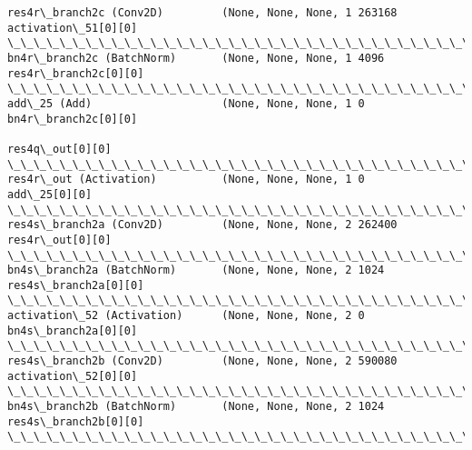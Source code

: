 \documentclass[11pt]{article}
\begin{document}
\begin{Verbatim}[commandchars=\\\{\}]
res4r\_branch2c (Conv2D)         (None, None, None, 1 263168      activation\_51[0][0]              
\_\_\_\_\_\_\_\_\_\_\_\_\_\_\_\_\_\_\_\_\_\_\_\_\_\_\_\_\_\_\_\_\_\_\_\_\_\_\_\_\_\_\_\_\_\_\_\_\_\_\_\_\_\_\_\_\_\_\_\_\_\_\_\_\_\_\_\_\_\_\_\_\_\_\_\_\_\_\_\_\_\_\_\_\_\_\_\_\_\_\_\_\_\_\_\_\_\_
bn4r\_branch2c (BatchNorm)       (None, None, None, 1 4096        res4r\_branch2c[0][0]             
\_\_\_\_\_\_\_\_\_\_\_\_\_\_\_\_\_\_\_\_\_\_\_\_\_\_\_\_\_\_\_\_\_\_\_\_\_\_\_\_\_\_\_\_\_\_\_\_\_\_\_\_\_\_\_\_\_\_\_\_\_\_\_\_\_\_\_\_\_\_\_\_\_\_\_\_\_\_\_\_\_\_\_\_\_\_\_\_\_\_\_\_\_\_\_\_\_\_
add\_25 (Add)                    (None, None, None, 1 0           bn4r\_branch2c[0][0]              
                                                                 res4q\_out[0][0]                  
\_\_\_\_\_\_\_\_\_\_\_\_\_\_\_\_\_\_\_\_\_\_\_\_\_\_\_\_\_\_\_\_\_\_\_\_\_\_\_\_\_\_\_\_\_\_\_\_\_\_\_\_\_\_\_\_\_\_\_\_\_\_\_\_\_\_\_\_\_\_\_\_\_\_\_\_\_\_\_\_\_\_\_\_\_\_\_\_\_\_\_\_\_\_\_\_\_\_
res4r\_out (Activation)          (None, None, None, 1 0           add\_25[0][0]                     
\_\_\_\_\_\_\_\_\_\_\_\_\_\_\_\_\_\_\_\_\_\_\_\_\_\_\_\_\_\_\_\_\_\_\_\_\_\_\_\_\_\_\_\_\_\_\_\_\_\_\_\_\_\_\_\_\_\_\_\_\_\_\_\_\_\_\_\_\_\_\_\_\_\_\_\_\_\_\_\_\_\_\_\_\_\_\_\_\_\_\_\_\_\_\_\_\_\_
res4s\_branch2a (Conv2D)         (None, None, None, 2 262400      res4r\_out[0][0]                  
\_\_\_\_\_\_\_\_\_\_\_\_\_\_\_\_\_\_\_\_\_\_\_\_\_\_\_\_\_\_\_\_\_\_\_\_\_\_\_\_\_\_\_\_\_\_\_\_\_\_\_\_\_\_\_\_\_\_\_\_\_\_\_\_\_\_\_\_\_\_\_\_\_\_\_\_\_\_\_\_\_\_\_\_\_\_\_\_\_\_\_\_\_\_\_\_\_\_
bn4s\_branch2a (BatchNorm)       (None, None, None, 2 1024        res4s\_branch2a[0][0]             
\_\_\_\_\_\_\_\_\_\_\_\_\_\_\_\_\_\_\_\_\_\_\_\_\_\_\_\_\_\_\_\_\_\_\_\_\_\_\_\_\_\_\_\_\_\_\_\_\_\_\_\_\_\_\_\_\_\_\_\_\_\_\_\_\_\_\_\_\_\_\_\_\_\_\_\_\_\_\_\_\_\_\_\_\_\_\_\_\_\_\_\_\_\_\_\_\_\_
activation\_52 (Activation)      (None, None, None, 2 0           bn4s\_branch2a[0][0]              
\_\_\_\_\_\_\_\_\_\_\_\_\_\_\_\_\_\_\_\_\_\_\_\_\_\_\_\_\_\_\_\_\_\_\_\_\_\_\_\_\_\_\_\_\_\_\_\_\_\_\_\_\_\_\_\_\_\_\_\_\_\_\_\_\_\_\_\_\_\_\_\_\_\_\_\_\_\_\_\_\_\_\_\_\_\_\_\_\_\_\_\_\_\_\_\_\_\_
res4s\_branch2b (Conv2D)         (None, None, None, 2 590080      activation\_52[0][0]              
\_\_\_\_\_\_\_\_\_\_\_\_\_\_\_\_\_\_\_\_\_\_\_\_\_\_\_\_\_\_\_\_\_\_\_\_\_\_\_\_\_\_\_\_\_\_\_\_\_\_\_\_\_\_\_\_\_\_\_\_\_\_\_\_\_\_\_\_\_\_\_\_\_\_\_\_\_\_\_\_\_\_\_\_\_\_\_\_\_\_\_\_\_\_\_\_\_\_
bn4s\_branch2b (BatchNorm)       (None, None, None, 2 1024        res4s\_branch2b[0][0]             
\_\_\_\_\_\_\_\_\_\_\_\_\_\_\_\_\_\_\_\_\_\_\_\_\_\_\_\_\_\_\_\_\_\_\_\_\_\_\_\_\_\_\_\_\_\_\_\_\_\_\_\_\_\_\_\_\_\_\_\_\_\_\_\_\_\_\_\_\_\_\_\_\_\_\_\_\_\_\_\_\_\_\_\_\_\_\_\_\_\_\_\_\_\_\_\_\_\_

\end{Verbatim}
\end{document}

